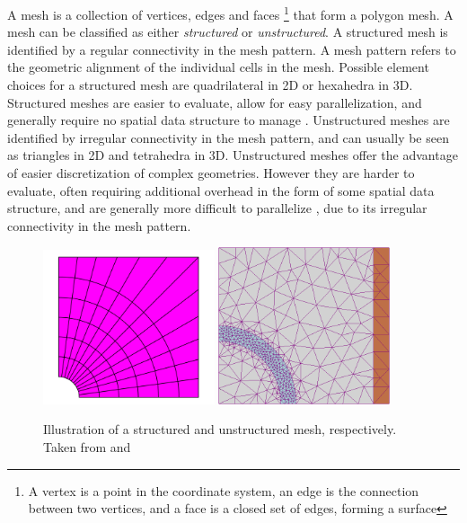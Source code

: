 A mesh is a collection of vertices, edges and faces \footnote{A vertex is a point in the coordinate system, an edge is the connection between two vertices, and a face is a closed set of edges, forming a surface} \cite{article15} that form a polygon mesh. A mesh can be classified as either \textit{structured} or \textit{unstructured}. A structured mesh is identified by a regular connectivity in the mesh pattern. A mesh pattern refers to the geometric alignment of the individual cells in the mesh. Possible element choices for a structured mesh are quadrilateral in 2D or hexahedra in 3D. Structured meshes are easier to evaluate, allow for easy parallelization, and generally require no spatial data structure to manage \cite{article2}. Unstructured meshes are identified by irregular connectivity in the mesh pattern, and can usually be seen as triangles in 2D and tetrahedra in 3D. Unstructured meshes offer the advantage of easier discretization of complex geometries. However they are harder to evaluate, often requiring additional overhead in the form of some spatial data structure, and are generally more difficult to parallelize \cite{article2}, due to its irregular connectivity in the mesh pattern. 
\begin{figure}[!h]
  \begin{center}
    \label{I_structured_mesh.png}
    \includegraphics[width=0.45\textwidth]{bilder/I_structured_mesh}
    \label{I_unstructured_mesh.png}
    \includegraphics[width=0.45\textwidth]{bilder/I_unstructured_mesh}
  \end{center}
  \caption{Illustration of a structured and unstructured mesh, respectively. Taken from \cite{pic2} and \cite{pic3}}
  \label{I_mesh_types}
\end{figure}

